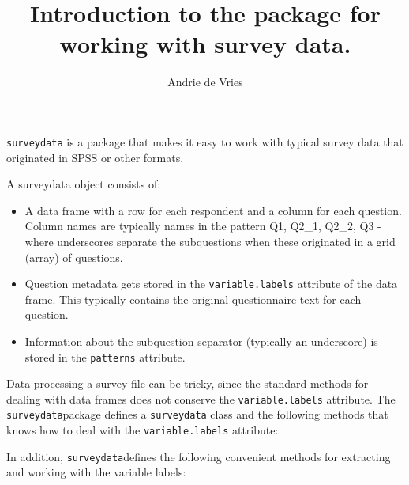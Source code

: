 \documentclass[a4paper]{article}
\title{Introduction to the \sdata{} package for working with survey data.}
\author{Andrie de Vries}
\newcommand{\sdata}{{\tt surveydata}}
\begin{document}


\maketitle

\sdata{} is a package that makes it easy to work with typical survey data that originated in SPSS or other formats.

A surveydata object consists of:

\begin{itemize}

  \item{A data frame with a row for each respondent and a column for each question.   Column names are typically names in the pattern Q1, Q2\_1, Q2\_2, Q3 - where underscores separate the subquestions when these originated in a grid (array) of questions.}

  \item{Question metadata gets stored in the \texttt{variable.labels} attribute of the data frame. This typically contains the original questionnaire text for each question.}
  
  \item{Information about the subquestion separator (typically an underscore) is stored in the \texttt{patterns} attribute.}
  
\end{itemize}


Data processing a survey file can be tricky, since the standard methods for dealing with data frames does not conserve the \texttt{variable.labels} attribute.  The \sdata package defines a \texttt{surveydata} class and the following methods that knows how to deal with the \texttt{variable.labels} attribute:

\itemize{
  \item {\texttt{as.surveydata}}
  \item {\texttt{[.surveydata}}
  \item {\texttt{[<-.surveydata}}
  \item {\texttt{\$.surveydata}}
  \item {\texttt{\$<-.surveydata}}
  \item {\texttt{merge.surveydata}}
}

In addition, \sdata defines the following convenient methods for extracting and working with the variable labels:

\end{document}

